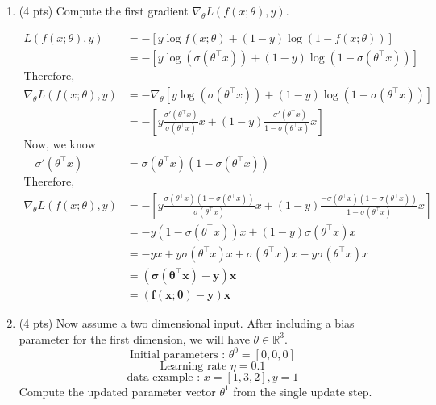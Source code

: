 \documentclass[a4paper]{article}
\theoremstyle{definition}
\newenvironment{soln}{
    \leavevmode\color{blue}\ignorespaces
}{}
\begin{document}
\begin{enumerate}
\begin{enumerate}
	\item (4 pts) Compute the first gradient $\nabla_{\theta} L(f(x;\theta), y)$.
	
	\begin{soln}
            \begin{align*}
                L(f(x;\theta), y) &= -[y \log f(x;\theta) + (1-y)\log(1-f(x;\theta))]\\
                &= -[y \log(\sigma(\theta^\top x)) + (1-y)\log(1-\sigma(\theta^\top x))]\\
            \text{Therefore,}\\
                \nabla_{\theta} L(f(x;\theta), y) &= -\nabla_{\theta}[y \log(\sigma(\theta^\top x)) + (1-y)\log(1-\sigma(\theta^\top x))]\\
                &= -[y \frac{\sigma'(\theta^\top x)}{\sigma(\theta^\top x)} x + (1-y) \frac{-\sigma'(\theta^\top x)}{1-\sigma(\theta^\top x)} x]\\
            \text{Now, we know}\\
                \quad\sigma'(\theta^\top x) &= \sigma(\theta^\top x)(1-\sigma(\theta^\top x))\\
            \text{Therefore,}\\
                \nabla_{\theta} L(f(x;\theta), y) &= -[y \frac{\sigma(\theta^\top x)(1-\sigma(\theta^\top x))}{\sigma(\theta^\top x)} x + (1-y) \frac{-\sigma(\theta^\top x)(1-\sigma(\theta^\top x))}{1-\sigma(\theta^\top x)} x]\\
                &= - y(1-\sigma(\theta^\top x))x + (1-y)\sigma(\theta^\top x)x\\
                &= -yx + y\sigma(\theta^\top x)x + \sigma(\theta^\top x)x - y\sigma(\theta^\top x)x\\
                &= \mathbf{(\sigma(\theta^\top x) - y)x}\\
                &= \mathbf{(f(x;\theta) - y)x}
            \end{align*}
        \end{soln}
	
	\item (4 pts)
 Now assume a two dimensional input. After including a bias parameter for the first dimension, we will have $\theta\in\mathbb{R}^3$.
$$ \text{Initial parameters : }  \theta^{0}=[0, 0, 0]$$
$$ \text{Learning rate }\eta=0.1$$
$$ \text{data example : } x=[1, 3, 2], y=1$$
Compute the updated parameter vector $\theta^{1}$ from the single update step.
	

\end{enumerate}
\end{enumerate}
\end{document}
